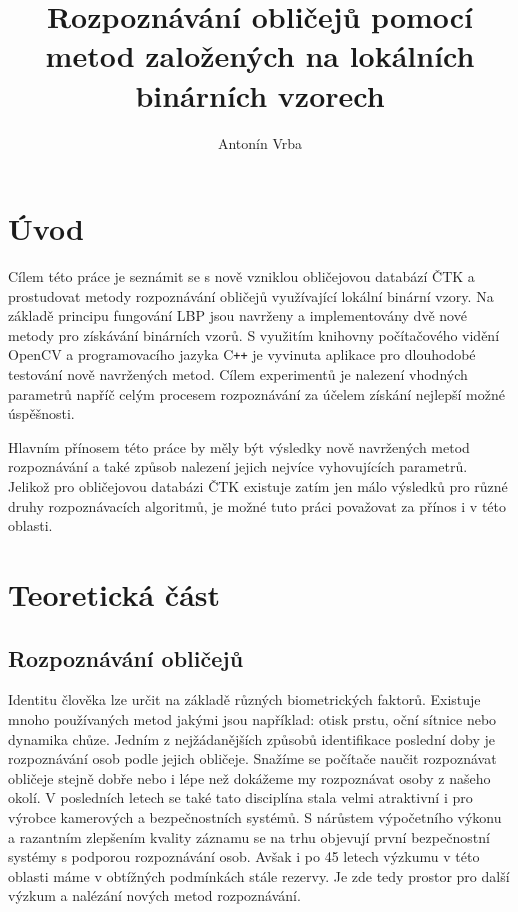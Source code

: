 \documentclass[czech,BP]{thesiskiv}
\author{Antonín Vrba}
\title{\LARGE Rozpoznávání obličejů pomocí metod založených na lokálních binárních vzorech}
\begin{document}
%
\maketitle
\tableofcontents

\chapter{Úvod}

Cílem této práce je seznámit se s nově vzniklou obličejovou databází ČTK a prostudovat metody rozpoznávání obličejů využívající lokální binární vzory. Na základě principu fungování LBP jsou navrženy a implementovány dvě nové metody pro získávání binárních vzorů. S využitím knihovny počítačového vidění OpenCV a programovacího jazyka C\texttt{++} je vyvinuta aplikace pro dlouhodobé testování nově navržených metod. Cílem experimentů je nalezení vhodných parametrů napříč celým procesem rozpoznávání za účelem získání nejlepší možné úspěšnosti. 



Hlavním přínosem této práce by měly být výsledky nově navržených metod rozpoznávání a také způsob nalezení jejich nejvíce vyhovujících parametrů. Jelikož pro obličejovou databázi ČTK existuje zatím jen málo výsledků pro různé druhy rozpoznávacích algoritmů, je možné tuto práci považovat za přínos i v této oblasti.
 
\chapter{Teoretická část}

\section{Rozpoznávání obličejů}
Identitu člověka lze určit na základě různých biometrických faktorů. Existuje mnoho používaných metod jakými jsou například: otisk prstu, oční sítnice nebo dynamika chůze. Jedním z nejžádanějších způsobů identifikace poslední doby je rozpoznávání osob podle jejich obličeje. Snažíme se počítače naučit rozpoznávat obličeje stejně dobře nebo i lépe než dokážeme my rozpoznávat osoby z našeho  okolí. V posledních letech se také tato disciplína stala velmi atraktivní i pro výrobce kamerových a bezpečnostních systémů. S nárůstem výpočetního výkonu a razantním zlepšením kvality záznamu se na trhu objevují první  bezpečnostní systémy s podporou rozpoznávání osob. Avšak i po 45 letech výzkumu v této oblasti máme v obtížných podmínkách stále rezervy. Je zde tedy prostor pro další výzkum a nalézání nových metod rozpoznávání.
\end{document}

